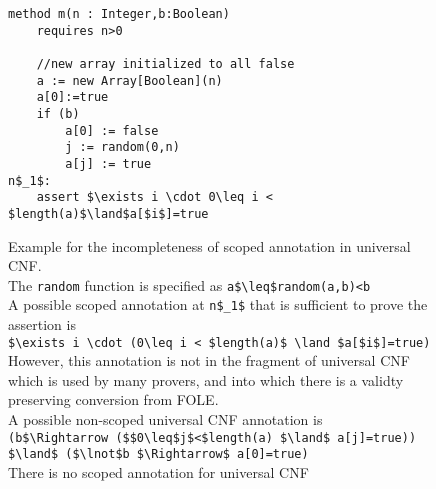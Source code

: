 \begin{figure}
\begin{lstlisting}
method m(n : Integer,b:Boolean)
	requires n>0
	
	//new array initialized to all false
	a := new Array[Boolean](n)
	a[0]:=true
	if (b)
		a[0] := false
		j := random(0,n)
		a[j] := true
n$_1$:
	assert $\exists i \cdot 0\leq i < $length(a)$\land$a[$i$]=true
\end{lstlisting}
\caption{Example for the incompleteness of scoped annotation in universal CNF.\\
The \lstinline|random| function is specified as \lstinline|a$\leq$random(a,b)<b|\\
A possible scoped annotation at \lstinline|n$_1$| that is sufficient to prove the assertion is \\
\lstinline|$\exists i \cdot (0\leq i < $length(a)$ \land $a[$i$]=true)|\\
However, this annotation is not in the fragment of universal CNF which is used by many provers, and into which there is a validty preserving conversion from FOLE.\\
A possible non-scoped universal CNF annotation is\\
\indent\lstinline|(b$\Rightarrow ($$0\leq$j$<$length(a) $\land$ a[j]=true)) $\land$ ($\lnot$b $\Rightarrow$ a[0]=true)|\\
There is no scoped annotation for universal CNF
}
\label{snippet_1.4}
\end{figure}

